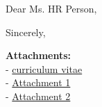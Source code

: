 \begin{coverletter}

    \displayCompanyAdress

    \vspace{10pt}

    \displaySubject%

    \vspace{10pt}

    Dear Ms. HR Person,

    \vspace{10pt}

    \Blindtext[3][1]

    \vspace{10pt}

    Sincerely,
    \displaysignature

    \vfill
    \textbf{Attachments:}\\
    \-- \hyperref[cvPage.2]{curriculum vitae}\\
    \-- \hyperref[attachment.1]{Attachment 1}\\
    \-- \hyperref[attachment.2]{Attachment 2}


\end{coverletter}
